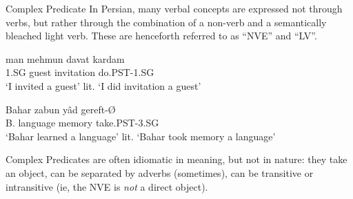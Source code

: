 \documentclass[10pt]{beamer}
\begin{document}
\begin{frame}[fragile]{Complex Predicate}
  In Persian, many verbal concepts are expressed not through verbs, but rather through the combination of a non-verb and a semantically bleached light verb. These are henceforth referred to as ``NVE'' and ``LV''.
  \pause
  \begin{exe}
    \ex
    \gll man mehmun davat kardam\\
    1.SG guest invitation do.PST-1.SG\\
    \trans `I invited a guest'
    \trans lit. `I did invitation a guest'
  \end{exe}
    \begin{exe}
    \ex
    \gll Bahar zabun yâd gereft-Ø\\
    B. language memory take.PST-3.SG\\
    \trans `Bahar learned a language'
    \trans lit. `Bahar took memory a language'
  \end{exe}

  \pause

  Complex Predicates are often idiomatic in meaning, but not in nature: they take an object, can be separated by adverbs (sometimes), can be transitive or intransitive (ie, the NVE is \emph{not} a direct object).

\end{frame}
\end{document}
